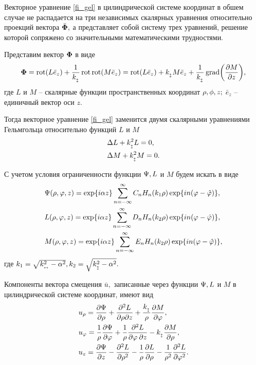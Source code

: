 Векторное уравнение \eqref{fi_gel} в цилиндрической системе координат в обшем случае не распадается на три независимых скалярных уравнения относительно проекций вектора $\bar{\F},$ а представляет собой систему трех уравнений, решение которой сопряжено со значительными математическими трудностями.

Представим вектор $\F$ в виде
$$\F=\rot(L\bar{e}_z)+\frac1{k_{\popr}}\rot\rot(M\bar{e}_z)=\rot(L\bar{e}_z)+k_{\popr} M\bar{e}_z+\frac1{k_{\popr}}\grad\biggl(\frac{\partial M}{\partial z}\biggr),$$
где $L$ и $M$ -- скалярные функции пространственных координат $\r, \phi, z;$ $\bar{e}_z$ -- единичный вектор оси $z.$

Тогда векторное уравнение \eqref{fi_gel} заменится двумя скалярными уравнениями Гельмгольца относительно функций $L$ и $M$
\begin{align*}
&\Lap L+k_{\popr}^2L=0,\\
&\Lap M+k_{\popr}^2M=0.
\end{align*}

С учетом условия ограниченности функции $\P, L$ и $M$ будем искать в виде
\begin{align}
&\P(\r, \f, z)= \exp\{i\alpha z\}\sum_{n=-\infty}^{\infty}C_nH_n(k_1 \r)\exp\{in(\f-\hat\f)\},\label{pazloj_psi}\\
&L(\r, \f, z)= \exp\{i\alpha z\}\sum_{n=-\infty}^{\infty}D_nH_n(k_2 \r)\exp\{in(\f-\hat\f)\},\label{pazloj_l}\\
&M(\r, \f, z)= \exp\{i\alpha z\}\sum_{n=-\infty}^{\infty}E_nH_n(k_2 \r)\exp\{in(\f-\hat\f)\},\label{pazloj_m}
\end{align}
где $k_1=\sqrt{k_{\prodol}^2-\alpha^2}, k_2=\sqrt{k_{\popr}^2-\alpha^2}.$

Компоненты вектора смещения $\bar{u},$ записанные через функции $\P, L$ и $M$ в цилиндрической системе координат, имеют вид
\begin{align}\label{u_cherez_L_M}
&u_{\r}=\frac{\partial \P}{\partial\r}+\frac{\partial^2 L}{\partial\r\partial z}+\frac{k_{\popr}}{\r}\frac{\partial M}{\partial \f},\\
&u_\f=\frac{1}{\r}\frac{\partial \P}{\partial \f}+\frac{1}{\r}\frac{\partial^{2} L}{\partial\f\: \partial z}-k_{\popr}\frac{\partial M}{\partial \r},\\
&u_z=\frac{\partial\P}{\partial z}-\frac{\partial^{2} L}{\partial \r^{2}}-\frac{1}{\r}\frac{\partial L}{\partial \r}-\frac{1}{\r^2}\frac{\partial^{2}L}{\partial\f^{2}}.
\end{align}

